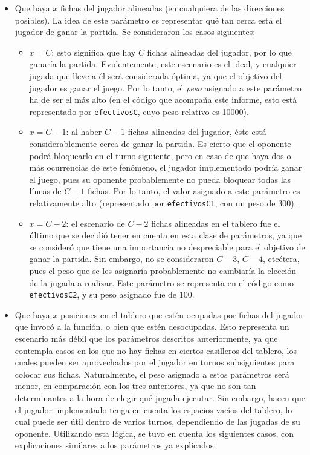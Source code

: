 \documentclass[12pt,a4paper]{article}
\begin{document}
    \begin{itemize}
        \item Que haya $x$ fichas del jugador alineadas (en cualquiera de las direcciones posibles). La idea de este parámetro es representar qué tan cerca está el jugador de ganar la partida. Se consideraron los casos siguientes:
            \begin{itemize}
                \item $x = C$: esto significa que hay $C$ fichas alineadas del jugador, por lo que ganaría la partida. Evidentemente, este escenario es el ideal, y cualquier jugada que lleve a él será considerada óptima, ya que el objetivo del jugador es ganar el juego. Por lo tanto, el \textit{peso} asignado a este parámetro ha de ser el más alto (en el código que acompaña este informe, esto está representado por \texttt{efectivosC}, cuyo peso relativo es 10000).
                \item $x = C-1$: al haber $C-1$ fichas alineadas del jugador, éste está considerablemente cerca de ganar la partida. Es cierto que el oponente podrá bloquearlo en el turno siguiente, pero en caso de que haya dos o más ocurrencias de este fenómeno, el jugador implementado podría ganar el juego, pues su oponente probablemente no pueda bloquear todas las líneas de $C-1$ fichas. Por lo tanto, el valor asignado a este parámetro es relativamente alto (representado por \texttt{efectivosC1}, con un peso de 300).
                \item $x = C-2$: el escenario de $C-2$ fichas alineadas en el tablero fue el último que se decidió tener en cuenta en esta clase de parámetros, ya que se consideró que tiene una importancia no despreciable para el objetivo de ganar la partida. Sin embargo, no se consideraron $C-3$, $C-4$, etcétera, pues el peso que se les asignaría probablemente no cambiaría la elección de la jugada a realizar. Este parámetro se representa en el código como \texttt{efectivosC2}, y su peso asignado fue de 100.
            \end{itemize}
        \item Que haya $x$ posiciones en el tablero que estén ocupadas por fichas del jugador que invocó a la función, o bien que estén desocupadas. Esto representa un escenario más débil que los parámetros descritos anteriormente, ya que contempla casos en los que no hay fichas en ciertos casilleros del tablero, los cuales pueden ser aprovechados por el jugador en turnos subsiguientes para colocar sus fichas. Naturalmente, el peso asignado a estos parámetros será menor, en comparación con los tres anteriores, ya que no son tan determinantes a la hora de elegir qué jugada ejecutar. Sin embargo, hacen que el jugador implementado tenga en cuenta los espacios vacíos del tablero, lo cual puede ser útil dentro de varios turnos, dependiendo de las jugadas de su oponente. Utilizando esta lógica, se tuvo en cuenta los siguientes casos, con explicaciones similares a los parámetros ya explicados:

\end{itemize}
\end{document}
